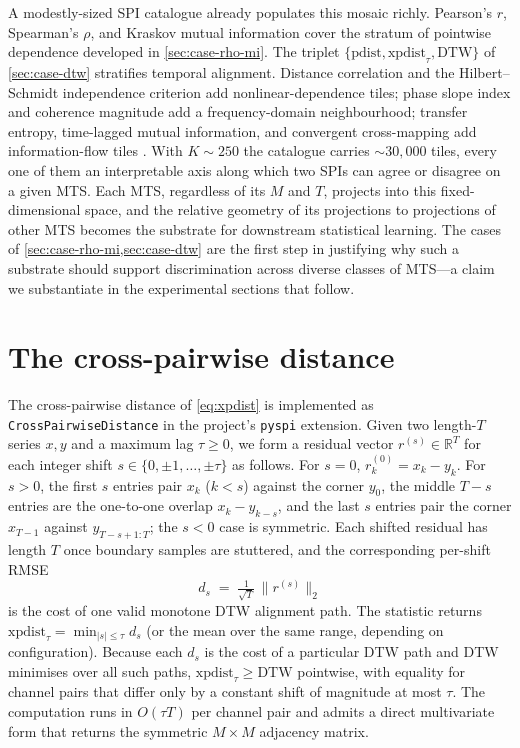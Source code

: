 \documentclass{article}
\theoremstyle{plain}
\theoremstyle{definition}
\theoremstyle{remark}
\begin{document}
A modestly-sized SPI catalogue already populates this mosaic richly. Pearson's $r$, Spearman's $\rho$, and Kraskov mutual information cover the stratum of pointwise dependence developed in \cref{sec:case-rho-mi}. The triplet $\{\mathrm{pdist},\mathrm{xpdist}_\tau,\mathrm{DTW}\}$ of \cref{sec:case-dtw} stratifies temporal alignment. Distance correlation and the Hilbert--Schmidt independence criterion add nonlinear-dependence tiles; phase slope index and coherence magnitude add a frequency-domain neighbourhood; transfer entropy, time-lagged mutual information, and convergent cross-mapping add information-flow tiles \citep{schreiber2000measuring,sugihara2012detecting,szekely2007measuring,nolte2008psi}. With $K \sim 250$ the catalogue carries $\sim 30{,}000$ tiles, every one of them an interpretable axis along which two SPIs can agree or disagree on a given MTS. Each MTS, regardless of its $M$ and $T$, projects into this fixed-dimensional space, and the relative geometry of its projections to projections of other MTS becomes the substrate for downstream statistical learning. The cases of \cref{sec:case-rho-mi,sec:case-dtw} are the first step in justifying why such a substrate should support discrimination across diverse classes of MTS---a claim we substantiate in the experimental sections that follow.




\newpage
\appendix
\onecolumn

\section{The cross-pairwise distance}
\label{app:xpdist}

The cross-pairwise distance of \cref{eq:xpdist} is implemented as \texttt{CrossPairwiseDistance} in the project's \texttt{pyspi} extension. Given two length-$T$ series $x,y$ and a maximum lag $\tau \ge 0$, we form a residual vector $r^{(s)} \in \mathbb{R}^T$ for each integer shift $s \in \{0,\pm 1,\dots,\pm \tau\}$ as follows. For $s = 0$, $r^{(0)}_k = x_k - y_k$. For $s > 0$, the first $s$ entries pair $x_k$ ($k < s$) against the corner $y_0$, the middle $T-s$ entries are the one-to-one overlap $x_{k} - y_{k-s}$, and the last $s$ entries pair the corner $x_{T-1}$ against $y_{T-s+1:T}$; the $s<0$ case is symmetric. Each shifted residual has length $T$ once boundary samples are stuttered, and the corresponding per-shift RMSE
\[
d_s \;=\; \tfrac{1}{\sqrt{T}}\,\|r^{(s)}\|_2
\]
is the cost of one valid monotone DTW alignment path. The statistic returns $\mathrm{xpdist}_\tau = \min_{|s|\le\tau} d_s$ (or the mean over the same range, depending on configuration). Because each $d_s$ is the cost of a particular DTW path and DTW minimises over all such paths, $\mathrm{xpdist}_\tau \ge \mathrm{DTW}$ pointwise, with equality for channel pairs that differ only by a constant shift of magnitude at most $\tau$. The computation runs in $O(\tau T)$ per channel pair and admits a direct multivariate form that returns the symmetric $M{\times}M$ adjacency matrix.
\end{document}
